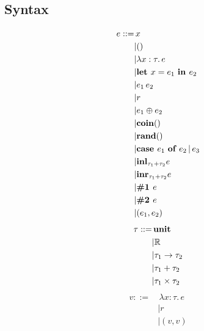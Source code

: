 \documentclass{article}
\begin{document}
		\subsection{Syntax}
		\begin{multicols}{2}
			\begin{equation*}
				\begin{split}
					e ::=
					&\, x \\
					&| () \\
					&| \lambda x : \tau.\, e \\
					&| \text{\bf let } x = e_1 \text{ \bf in } e_2 \\
					&| e_1\, e_2 \\
					&| r \\
					&| e_1 \oplus e_2 \\
					&| {\bf coin()} \\
					&| {\bf rand()} \\
					&| \text{\bf case } e_1 \text{ \bf of } e_2 \,|\, e_3 \\
					&| {\bf inl}_{\tau_1 + \tau_2} e \\
					&| {\bf inr}_{\tau_1 + \tau_2} e \\
					&| \text{\bf \#1 } e \\
					&| \text{\bf \#2 } e \\
					&| (e_1, e_2) \\
				\end{split}
			\end{equation*}			
		\begin{equation*}
			\begin{split}
				\tau ::=
				&\, {\bf unit} \\
				&| \mathbb{R} \\
				&| \tau_1 \to \tau_2 \\
				&| \tau_1 + \tau_2 \\
				&| \tau_1 \times \tau_2 \\
			\end{split}
		\end{equation*}
		\begin{equation*}
			\begin{split}
				v ::=
				&\, \lambda x:\tau.\, e \\
				&| r \\
				&| (v, v) \\
			\end{split}
		\end{equation*}
		\begin{equation*}
			\begin{split}

\end{split}
\end{equation*}
\end{multicols}
\end{document}

